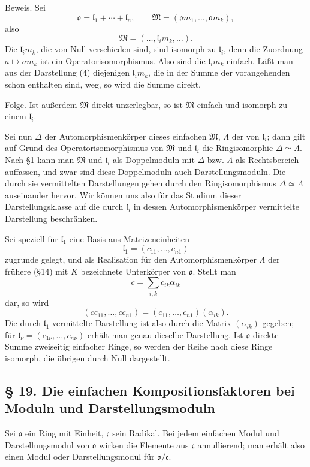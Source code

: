 \documentclass[11pt]{article}
\providecommand{\mM}{\mathfrak{M}}
\providecommand{\mo}{\mathfrak{o}}
\providecommand{\mc}{\mathfrak{c}}
\providecommand{\ml}{\mathfrak{l}}
\begin{document}
Beweis. Sei
\[
        \mo=\ml_1+\cdots+\ml_n,
        \qquad
        \mM=(\mo m_1,\ldots,\mo m_k),
\]
also
\[
        \mM=(\ldots,\ml_i m_k,\ldots).                     \tag{4}
\]
Die $\ml_i m_k$, die von Null verschieden sind, sind isomorph zu $\ml_i$, denn die Zuordnung $a\mapsto am_k$ ist ein Operatorisomorphismus. Also sind die $\ml_i m_k$ einfach. Läßt man aus der Darstellung (4) diejenigen $\ml_i m_k$, die in der Summe der vorangehenden schon enthalten sind, weg, so wird die Summe direkt.

Folge. Ist außerdem $\mM$ direkt-unzerlegbar, so ist $\mM$ einfach und isomorph zu einem $\ml_i$.

Sei nun $\Delta$ der Automorphismenkörper dieses einfachen $\mM$, $\Lambda$ der von $\ml_i$; dann gilt auf Grund des Operatorisomorphismus von $\mM$ und $\ml_i$ die Ringisomorphie $\Delta\simeq\Lambda$. Nach §1 kann man $\mM$ und $\ml_i$ als Doppelmoduln mit $\Delta$ bzw. $\Lambda$ als Rechtsbereich auffassen, und zwar sind diese Doppelmoduln auch Darstellungsmoduln. Die durch sie vermittelten Darstellungen gehen durch den Ringisomorphismus $\Delta\simeq\Lambda$ auseinander hervor. Wir können uns also für das Studium dieser Darstellungsklasse auf die durch $\ml_i$ in dessen Automorphismenkörper vermittelte Darstellung beschränken.

Sei speziell für $\ml_1$ eine Basis aus Matrizeneinheiten
\[
        \ml_1=(c_{11},\ldots,c_{n1})
\]
zugrunde gelegt, und als Realisation für den Automorphismenkörper $\Lambda$ der frühere (§14) mit $K$ bezeichnete Unterkörper von $\mo$. Stellt man
\[
        c=\sum_{i,k} c_{ik}\alpha_{ik}
\]
dar, so wird
\[
        (cc_{11},\ldots,cc_{n1})=(c_{11},\ldots,c_{n1})(\alpha_{ik}).
\]
Die durch $\ml_1$ vermittelte Darstellung ist also durch die Matrix $(\alpha_{ik})$ gegeben; für $\ml_\nu=(c_{1\nu},\ldots,c_{n\nu})$ erhält man genau dieselbe Darstellung. Ist $\mo$ direkte Summe zweiseitig einfacher Ringe, so werden der Reihe nach diese Ringe isomorph, die übrigen durch Null dargestellt.

\subsection*{§ 19. Die einfachen Kompositionsfaktoren bei Moduln und Darstellungsmoduln}
Sei $\mo$ ein Ring mit Einheit, $\mc$ sein Radikal. Bei jedem einfachen Modul und Darstellungsmodul von $\mo$ wirken die Elemente aus $\mc$ annullierend; man erhält also einen Modul oder Darstellungsmodul für $\mo/\mc$.
\end{document}
